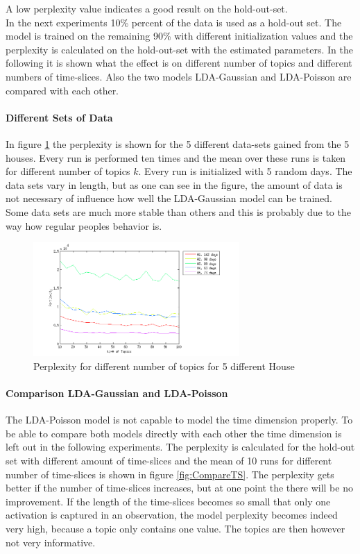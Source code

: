 A low perplexity value indicates a good result on the hold-out-set.\\

In the next experiments 10\% percent of the data is used as a hold-out set. The model is trained on the remaining 90\% with different initialization values and the perplexity is calculated on the hold-out-set with the estimated parameters. In the following it is shown what the effect is on different number of topics and different numbers of time-slices. Also the two models LDA-Gaussian and LDA-Poisson are compared with each other.

\paragraph{Different Sets of Data}
In figure \ref{fig:PerplGaus} the perplexity is shown for the 5 different data-sets gained from the 5 houses. Every run is performed ten times and the mean over these runs is taken for different number of topics $k$. Every run is initialized with 5 random days.
The data sets vary in length, but as one can see in the figure, the amount of data is not necessary of influence how well the LDA-Gaussian model can be trained. Some data sets are much more stable than others and this is probably due to the way how regular peoples behavior is.

\begin{figure}[h!]
 \centering
 \includegraphics[width=0.7\textwidth]{Pictures/PerplGaus.png}
 \caption{Perplexity for different number of topics for 5 different House}
 \label{fig:PerplGaus}
\end{figure}

\pagebreak
\paragraph{Comparison LDA-Gaussian and LDA-Poisson}
The LDA-Poisson model is not capable to model the time dimension properly. To be able to compare both models directly with each other the time dimension is left out in the following experiments. The perplexity is calculated for the hold-out set with different amount of time-slices and the mean of 10 runs for different number of time-slices is shown in figure \ref{fig:CompareTS}. The perplexity gets better if the number of time-slices increases, but at one point the there will be no improvement. If the length of the time-slices becomes so small that only one activation is captured in an observation, the model perplexity becomes indeed very high, because a topic only contains one value. The topics are then however not very informative.\\

